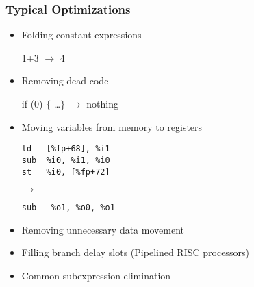 \documentclass{plt}
\begin{document}
\begin{frame}[fragile]
  \frametitle{Typical Optimizations}

\begin{itemize}

\item Folding constant expressions

1+3 $\rightarrow$ 4

\item Removing dead code

if (0) $\{$ \ldots $\}$ $\rightarrow$ nothing

\item Moving variables from memory to registers

\medskip

\begin{minipage}{0.35\textwidth}
\begin{verbatim}
ld   [%fp+68], %i1
sub  %i0, %i1, %i0
st   %i0, [%fp+72]
\end{verbatim}
\end{minipage}
$\rightarrow$ 
\begin{minipage}{0.4\textwidth}
\begin{verbatim}
sub   %o1, %o0, %o1
\end{verbatim}
\end{minipage}

\medskip

\item Removing unnecessary data movement

\item Filling branch delay slots (Pipelined RISC processors)

\item Common subexpression elimination

\end{itemize}

\end{frame}
\end{document}
